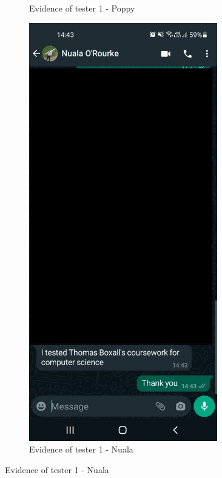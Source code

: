 \begin{figure}[H]
\begin{minipage}{0.45\textwidth}
\begin{figure}[H]
        \caption{Evidence of tester 1 - Poppy}
        \label{fig:evidencePoppy}
        \end{figure}
    \end{minipage} \hfill
    \begin{minipage}{0.45\textwidth}
        \begin{figure}[H]
        \centering
        \includegraphics[width=0.9\textwidth]{images/evalutation/Evidence from Nuala.jpg}
        \caption{Evidence of tester 1 - Nuala}
        \label{fig:evidenceNuala}
        \end{figure}
    \end{minipage}
\end{figure}
